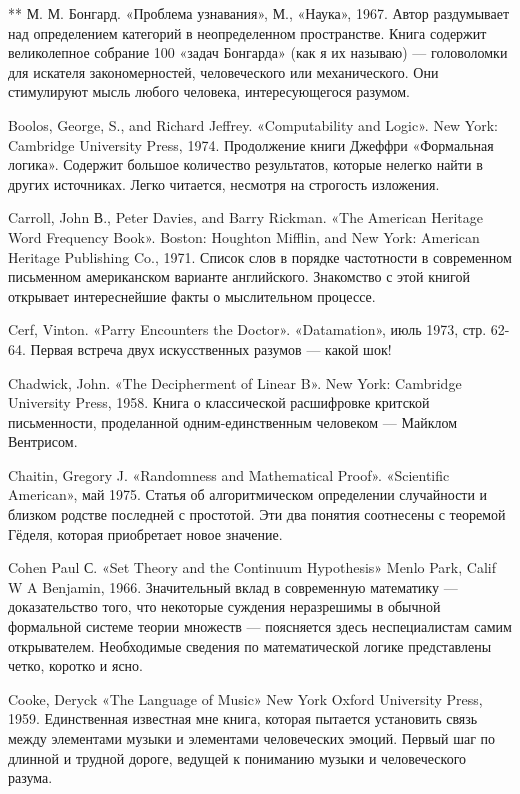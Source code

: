 ** М. М. Бонгард. «Проблема узнавания», М., «Наука», 1967. Автор раздумывает над определением категорий в неопределенном пространстве. Книга содержит великолепное собрание 100 «задач Бонгарда» (как я их называю) --- головоломки для искателя закономерностей, человеческого или механического. Они стимулируют мысль любого человека, интересующегося разумом.

Boolos, George, S., and Richard Jeffrey. «Computability and Logic». New York: Cambridge University Press, 1974. Продолжение книги Джеффри «Формальная логика». Содержит большое количество результатов, которые нелегко найти в других источниках. Легко читается, несмотря на строгость изложения.

Carroll, John В., Peter Davies, and Barry Rickman. «The American Heritage Word Frequency Book». Boston: Houghton Mifflin, and New York: American Heritage Publishing Co., 1971. Список слов в порядке частотности в современном письменном американском варианте английского. Знакомство с этой книгой открывает интереснейшие факты о мыслительном процессе.

Cerf, Vinton. «Parry Encounters the Doctor». «Datamation», июль 1973, стр. 62- 64. Первая встреча двух искусственных разумов --- какой шок!

Chadwick, John. «The Decipherment of Linear B». New York: Cambridge University Press, 1958. Книга о классической расшифровке критской письменности, проделанной одним-единственным человеком --- Майклом Вентрисом.

Chaitin, Gregory J. «Randomness and Mathematical Proof». «Scientific American», май 1975. Статья об алгоритмическом определении случайности и близком родстве последней с простотой. Эти два понятия соотнесены с теоремой Гёделя, которая приобретает новое значение.

Cohen Paul С. «Set Theory and the Continuum Hypothesis» Menlo Park, Calif W A Benjamin, 1966. Значительный вклад в современную математику --- доказательство того, что некоторые суждения неразрешимы в обычной формальной системе теории множеств --- поясняется здесь неспециалистам самим открывателем. Необходимые сведения по математической логике представлены четко, коротко и ясно.

Cooke, Deryck «The Language of Music» New York Oxford University Press, 1959. Единственная известная мне книга, которая пытается установить связь между элементами музыки и элементами человеческих эмоций. Первый шаг по длинной и трудной дороге, ведущей к пониманию музыки и человеческого разума.

